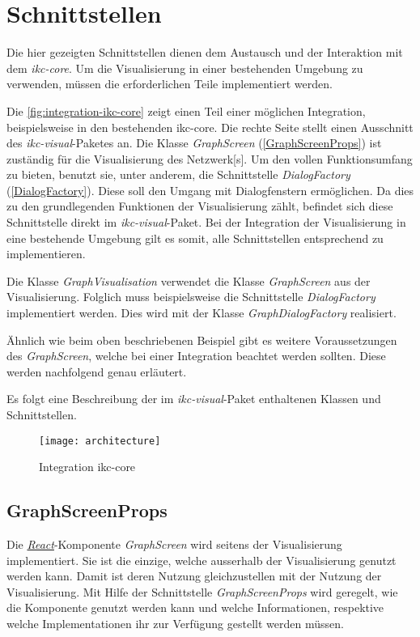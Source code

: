 \section{Schnittstellen} \label{schnittstellen}

Die hier gezeigten Schnittstellen dienen dem Austausch und der Interaktion mit dem \textit{ikc-core}. Um die Visualisierung in einer bestehenden Umgebung zu verwenden, müssen die erforderlichen Teile implementiert werden.

Die \autoref{fig:integration-ikc-core} zeigt einen Teil einer möglichen Integration, beispielsweise in den bestehenden \gls{ikc-core}. Die rechte Seite stellt einen Ausschnitt des \textit{ikc-visual}-Paketes an. Die Klasse \textit{GraphScreen} (\autoref{GraphScreenProps}) ist zu\-stä\-ndig für die Visualisierung des \gls{Netzwerk}[s]. Um den vollen Funktionsumfang zu bieten, benutzt sie, unter anderem, die Schnittstelle \textit{DialogFactory} (\autoref{DialogFactory}). Diese soll den Umgang mit Dialogfenstern ermöglichen. Da dies zu den grundlegenden Funktionen der Visualisierung zählt, befindet sich diese Schnittstelle direkt im \textit{ikc-visual}-Paket. Bei der Integration der Visualisierung in eine bestehende Umgebung gilt es somit, alle Schnittstellen entsprechend zu implementieren.

Die Klasse \textit{GraphVisualisation} verwendet die Klasse \textit{GraphScreen} aus der Visualisierung. Folglich muss beispielsweise die Schnittstelle \textit{DialogFactory} implementiert werden. Dies wird mit der Klasse \textit{GraphDialogFactory} realisiert.

Ähnlich wie beim oben beschriebenen Beispiel gibt es weitere Voraussetzungen des \textit{GraphScreen}, welche bei einer Integration beachtet werden sollten. Diese werden nachfolgend genau erläutert.

Es folgt eine Beschreibung der im \textit{ikc-visual}-Paket enthaltenen Klassen und Schnittstellen. 
\begin{figure}[htbp]
\centering
\texttt{[image: architecture]}
\caption{Integration \gls{ikc-core}}
\label{fig:integration-ikc-core}
\end{figure}

\subsection{GraphScreenProps}\label{GraphScreenProps}
Die \hyperref[react]{\textit{React}}-Komponente \textit{GraphScreen} wird seitens der Visualisierung implementiert. Sie ist die einzige, welche ausserhalb der Visualisierung genutzt werden kann. Damit ist deren Nutzung gleichzustellen mit der Nutzung der Visualisierung. Mit Hilfe der Schnittstelle \textit{GraphScreenProps} wird geregelt, wie die Komponente genutzt werden kann und welche Informationen, respektive welche Implementationen ihr zur Verfügung gestellt werden müssen.  

